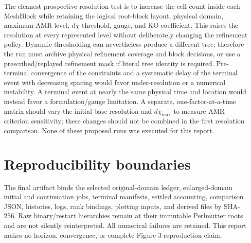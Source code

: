 \documentclass[11pt]{article}
\begin{document}
The cleanest prospective resolution test is to increase the cell count inside
each MeshBlock while retaining the logical root-block layout, physical domain,
maximum AMR level, $d\chi$ threshold, gauge, and KO coefficient.  This raises
the resolution at every represented level without deliberately changing the
refinement policy.  Dynamic thresholding can nevertheless produce a different
tree; therefore the run must archive physical refinement coverage and block
decisions, or use a prescribed/replayed refinement mask if literal tree
identity is required.  Pre-terminal convergence of the constraints and a
systematic delay of the terminal event with decreasing spacing would favor
under-resolution or a numerical instability.  A terminal event at nearly the
same physical time and location would instead favor a formulation/gauge
limitation.  A separate, one-factor-at-a-time matrix should vary the initial
base resolution and $d\chi_{\max}$ to measure AMR-criterion sensitivity; these
changes should not be combined in the first resolution comparison.  None of
these proposed runs was executed for this report.

\section{Reproducibility boundaries}
The final artifact binds the selected original-domain ledger, enlarged-domain
initial and continuation jobs, terminal manifests, settled accounting,
comparison JSON, histories, logs, rank bindings, plotting inputs, and derived
files by SHA-256.  Raw binary/restart hierarchies remain at their immutable
Perlmutter roots and are not silently reinterpreted.  All numerical failures
are retained.  This report makes no horizon, convergence, or complete
Figure-3 reproduction claim.
\end{document}

